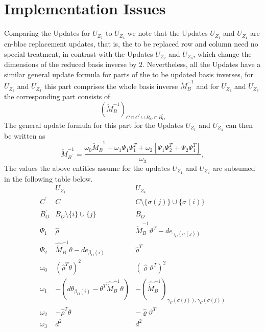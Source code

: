 \documentclass[a4paper]{article}
\begin{document}
\section{Implementation Issues}
Comparing the Updates for $U_{Z_{1}}$ to $U_{Z_{4}}$ we note that the Updates
$U_{Z_{1}}$ and $U_{Z_{4}}$ are en-bloc replacement updates, that is, the to be
replaced row and column need no special treatment, in contrast with the Updates
$U_{Z_{2}}$ and $U_{Z_{3}}$, which change the dimensions of the reduced basis
inverse by $2$. Nevertheless, all the Updates have a similar general update
formula for parts of the to be updated basis inverses,
for $U_{Z_{1}}$ and $U_{Z_{4}}$ this part comprises the whole
basis inverse $\check{M}_{B}^{-1}$ and for $U_{Z_{2}}$
and $U_{Z_{3}}$ the corresponding part consists of  
\begin{equation}
\left(
 \check{M}_{B}^{-1}
\right)_{C \cap C^{\prime} \cup B_{O} \cap B_{O}^{\prime}}
\end{equation}
The general update formula for this part for the Updates
$U_{Z_{1}}$ and $U_{Z_{4}}$ can then be written as 
\begin{equation}
\check{M}_{B^{\prime}}^{-1}
=
\frac{
\omega_{0}\check{M}_{B}^{-1}
+\omega_{1}\Psi_{1}\Psi_{1}^{T}
+\omega_{2}\left[\Psi_{1}\Psi_{2}^{T}+\Psi_{2}\Psi_{1}^{T}\right]
}{\omega_{3}},
\end{equation}
The values the above entities assume for the updates $U_{Z_{1}}$ and
$U_{Z_{4}}$ are subsumed in the following table below.
\begin{equation}
\begin{array}{c|cc}
& U_{Z_{1}} & U_{Z_{4}} \\
\hline
C^{\prime}
& C
& C \setminus \{\sigma(j)\} \cup \{\sigma(i)\}
\\
B_{O}^{\prime}
& B_{O} \setminus \{i\} \cup \{j\}
& B_{O}
\\
\Psi_{1}
& \hat{\rho}
& \hat{\check{M}}_{B}^{-1}\vartheta^{T}-de_{\gamma_{C}(\sigma(j))}
\\
\Psi_{2}
& \hat{\check{M}}_{B}^{-1}\theta-de_{\beta_{O}(i)}
& \hat{\varrho}^{T}
\\
\omega_{0}
& \left(\hat{\rho}^{T}\theta\right)^{2}
& \left(\hat{\varrho}\vartheta^{T}\right)^{2}
\\
\omega_{1}
& -\left(
   d\theta_{\beta_{O}(i)}-\theta^{T}\hat{\check{M}}_{B}^{-1}\theta
  \right) 
& -\left(
   \hat{\check{M}}_{B}^{-1}
  \right)_{\gamma_{C}(\sigma(j)), \gamma_{C}(\sigma(j))} 
\\
\omega_{2}
& -\hat{\rho}^{T}\theta
& -\hat{\varrho}\vartheta^{T}
\\
\omega_{3}
& d^{2}
& d^{2}
\end{array}
\end{equation}
 
\end{document}
